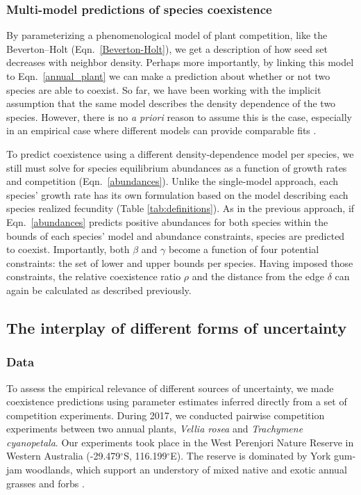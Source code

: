 \begin{refsection}
\subsubsection*{Multi-model predictions of species coexistence}

By parameterizing a phenomenological model of plant competition, like the Beverton--Holt (Eqn.~\ref{Beverton-Holt}), we get a description of how seed set decreases with neighbor density. Perhaps more importantly, by linking this model to  Eqn.~\ref{annual_plant} we can make a prediction about whether or not two species are able to coexist. So far, we have been working with the implicit assumption that the same model describes the density dependence of the two species. However, there is no \textit{a priori} reason to assume this is the case, especially in an empirical case where different models can provide comparable fits \citep{hart2018quantify}.


To predict coexistence using a different density-dependence model per species, we still must solve for species equilibrium abundances as a function of growth rates and competition (Eqn.~\ref{abundances}). Unlike the single-model approach, each species' growth rate has its own formulation based on the model describing each species realized fecundity (Table \ref{tab:definitions}). As in the previous approach, if Eqn.~\ref{abundances} predicts positive abundances for both species within the bounds of each species' model and abundance constraints, species are predicted to coexist. Importantly, both $\beta$ and $\gamma$ become a function of four potential constraints: the set of lower and upper bounds per species. Having imposed those constraints, the relative coexistence ratio $\rho$ and the distance from the edge $\delta$ can again be calculated as described previously.


\subsection*{The interplay of different forms of uncertainty}

\subsubsection*{Data}

To assess the empirical relevance of different sources of uncertainty, we made coexistence predictions using parameter estimates inferred directly from a set of competition experiments. During 2017, we conducted pairwise competition experiments between two annual plants, \textit{Vellia rosea} and \textit{Trachymene cyanopetala}. Our experiments took place in the West Perenjori Nature Reserve in Western Australia (-29.479$^{\circ}$S, 116.199$^{\circ}$E). The reserve is dominated by York gum-jam woodlands, which support an understory of mixed native and exotic annual grasses and forbs \citep{dwyer2015climate}.


\end{refsection}
